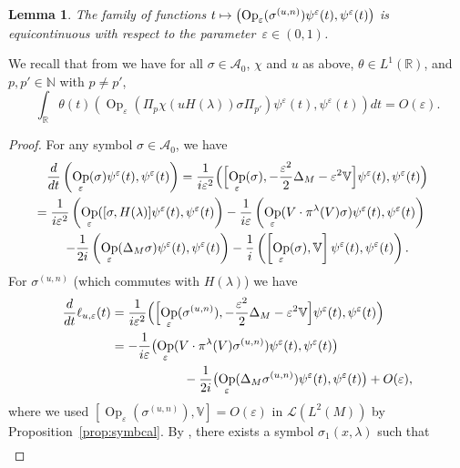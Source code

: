 \documentclass[10pt]{amsart}
\let\mathcal\mathscr
\newcommand\mto{\mathchoice{\longmapsto}{\mapsto}{\mapsto}{\mapsto}}
\DeclareMathOperator{\Op}{Op}
\theoremstyle{plain}
\newtheorem{lemma}[theorem]{Lemma}
\theoremstyle{definition}
\let\eps\varepsilon
\def\R{{\mathbb R}}
\def\N{{\mathbb N}}
\def\bbV{{\mathbb V}}
\begin{document}
\begin{lemma}\label{lem:equicontinuity}
The family of functions $t\mto \left(\Op_\eps(\sigma^{(u,n)}) \psi^\eps(t),\psi^\eps(t)\right)$ is equicontinuous with respect to the parameter~$\eps\in(0,1)$.
\end{lemma}

We recall that from \cite[Th.\,2.5(i)]{FF} we have for all $\sigma\in{{\mathcal A}_0}$, $\chi$ and $u$ as above, $\theta\in L^1(\R)$, and $p,p'\in\N$ with $p\not=p'$,
\begin{equation*}%
\int_\R \theta(t) \left(\Op_\eps(\Pi_p \chi(uH(\lambda))\sigma\Pi_{p'}) \psi^\eps(t),\psi^\eps(t)\right) dt = O(\eps).
\end{equation*}

\begin{proof}
For any symbol $\sigma\in{{\mathcal A}_0}$, we have
\begin{multline}\label{eq:d/dt}
\frac d{dt} \left(\Op_\eps(\sigma) \psi^\eps(t),\psi^\eps(t)\right) = \frac 1{i\eps^2} \Bigl(\Bigl[\Op_\eps(\sigma), -\frac {\eps^2} 2 \Delta_M-\eps^2\bbV\Bigr] \psi^\eps(t),\psi^\eps(t)\Bigr)\\
\shoveright{= \frac 1{i\eps^2} \left(\Op_\eps([\sigma, H(\lambda)] \psi^\eps(t),\psi^\eps(t)\right)
-\frac 1{i\eps} \left(\Op_\eps(V\cdot \pi^\lambda(V)\sigma) \psi^\eps(t),\psi^\eps(t)\right)} \\
-\frac {1} {2i} \left(\Op_\eps(\Delta_M \sigma) \psi^\eps(t),\psi^\eps(t)\right) -\frac {1} {i} \left(\left[\Op_\eps(\sigma),\bbV \right] \psi^\eps(t),\psi^\eps(t)\right).
\end{multline}
For $\sigma^{(u,n)}$ (which commutes with $H(\lambda)$) we have
\begin{align*}
\frac d{dt} \ell_{u,\eps}(t) & = \frac 1{i\eps^2} \Bigl(\Bigl[\Op_\eps(\sigma^{(u,n)}), -\frac {\eps^2} 2 \Delta_M -\eps ^2 \bbV\Bigr] \psi^\eps(t),\psi^\eps(t)\Bigr)\\
&=
-\frac 1{i\eps} \bigl(\Op_\eps(V\cdot \pi^\lambda(V)\sigma^{(u,n)}) \psi^\eps(t),\psi^\eps(t)\bigr)\\
&\hspace*{2cm} -\frac {1} {2i} \bigl(\Op_\eps(\Delta_M \sigma^{(u,n)}) \psi^\eps(t),\psi^\eps(t)\bigr) +O(\eps),
\end{align*}
where we used $ [\Op_\eps(\sigma^{(u,n)}), \bbV] =O(\eps) $ in $\mathcal L(L^2(M))$ by Proposition~\ref{prop:symbcal}.
By \cite[Lem.\,4.1]{FF}, there exists a symbol $\sigma_1(x,\lambda)$ such that
\begin{align}

\end{align}
\end{proof}
\end{document}
